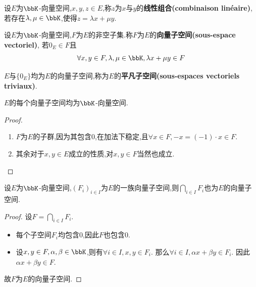 \begin{deff}
    设$E$为$\bbK$-向量空间,$x, y, z \in E$,称$z$为$x$与$y$的\textbf{线性组合(combinaison linéaire)},
    若存在$\lambda, \mu \in \bbK$,使得$z = \lambda x + \mu y$.
\end{deff}

\begin{deff}
    设$E$为$\bbK$-向量空间,$F$为$E$的非空子集.称$F$为$E$的\textbf{向量子空间(sous-espace vectoriel)},
    若$0_E \in F$且\[ \forall x, y \in F, \lambda, \mu \in \bbK, \lambda x + \mu y \in F \]
\end{deff}

\begin{rqq}
    $E$与$\{ 0_E \}$均为$E$的向量子空间,称为$E$的\textbf{平凡子空间(sous-espaces vectoriels triviaux)}.
\end{rqq}

\begin{prop}
    $E$的每个向量子空间均为$\bbK$-向量空间.
\end{prop}

\begin{proof} $\ $
    \begin{enumerate}
        \item $F$为$E$的子群,因为其包含$0$,在加法下稳定,且$\forall x \in F, -x = (-1) \cdot x \in F$.
        \item 其余对于$x, y \in E$成立的性质,对$x, y \in F$当然也成立.
    \end{enumerate}
\end{proof}

\begin{prop} \label{prop:intersection_of_subspaces}
    设$E$为$\bbK$-向量空间,$(F_i)_{i \in I}$为$E$的一族向量子空间,则$\bigcap\limits_{i \in I} F_i$也为$E$的向量子空间.
\end{prop}

\begin{proof}
    设$F = \bigcap\limits_{i \in I} F_i$.

    \begin{itemize}
        \item 每个子空间$F_i$均包含0,因此$F$也包含0.
        \item 设$x, y \in F, \alpha, \beta \in \bbK$,则有$\forall i \in I, x, y \in F_i$.
            那么$\forall i \in I, \alpha x + \beta y \in F_i$.
            因此$\alpha x + \beta y \in F$.
    \end{itemize}

    故$F$为$E$的向量子空间.
\end{proof}

